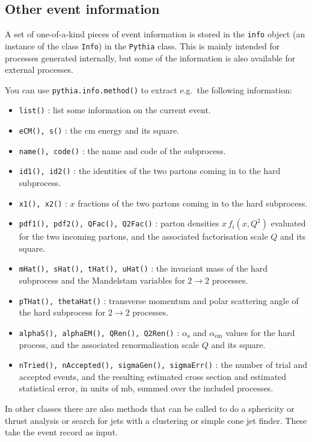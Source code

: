 \documentclass{elsartmod}
\begin{document}
\subsection{Other event information}

A set of one-of-a-kind pieces of event information is stored in the
\texttt{info} object (an instance of the class
\texttt{Info}) in the \texttt{Pythia} class. This is mainly
intended for processes generated internally, but some of the information
is also available for external processes.

You can use \texttt{pythia.info.method()} to extract e.g.\ the 
following information:
\begin{itemize}
\item \texttt{list()} : list some information on the current event. 
\item \texttt{eCM(), s()} : the cm energy and its square.
\item \texttt{name(), code()} : the name and code of the subprocess.
\item \texttt{id1(), id2()} : the identities of the two partons 
coming in to the hard subprocess.
\item \texttt{x1(), x2()} : $x$ fractions of the two partons coming 
in to the hard subprocess.
\item \texttt{pdf1(), pdf2(), QFac(), Q2Fac()} : parton densities 
$x \, f_i(x,Q^2 )$ evaluated for the two incoming partons, and the
associated factorisation scale $Q$ and its square.
\item \texttt{mHat(), sHat(), tHat(), uHat()} : the invariant mass of 
the hard subprocess and the Mandelstam variables for $2 \to 2$ 
processes.
\item \texttt{pTHat(), thetaHat()} : transverse momentum and polar
scattering angle of the hard subprocess for $2 \to 2$ processes.
\item \texttt{alphaS(), alphaEM(), QRen(), Q2Ren()} : 
$\alpha_{\mathrm{s}}$ and $\alpha_{\mathrm{em}}$ values for the 
hard process, and the associated renormalisation scale $Q$ and its square.
\item \texttt{nTried(), nAccepted(), sigmaGen(), sigmaErr()} :
the number of trial and accepted events, and the resulting estimated
cross section and estimated statistical error, in units of mb, summed 
over the included processes. 
\end{itemize}

In other classes there are also methods that can be called to do a 
sphericity or thrust analysis or search for jets with a clustering 
or simple cone jet finder. These take the event record as input.
\end{document}
